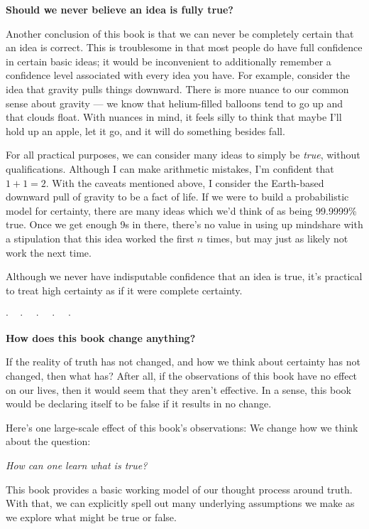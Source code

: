 \documentclass[9pt, twoside]{book}
\theoremstyle{argtstyle}
\newcommand{\dotq}{\cdot\quad}
\newcommand{\scenebreak}{
    \medskip\centerline{$\dotq\dotq\dotq\dotq\cdot$}\medskip
}
\begin{document}
\noindent
{\bf Should we never believe an idea is fully true?}

Another conclusion of this book is that we can never be completely certain
that an idea is correct.
This is troublesome in that most people do have full confidence in certain
basic
ideas; it would be inconvenient to additionally remember a confidence level
associated with every idea you have.
For example, consider the idea that gravity pulls things downward.
There is more nuance to our common sense about gravity --- we know that
helium-filled balloons tend to go up and that clouds float.
With nuances in mind, it feels silly to think that maybe I'll hold up an
apple, let it go, and it will do something besides fall.

For all practical purposes, we can consider many ideas to simply be {\em true},
without qualifications. Although I can make arithmetic mistakes, I'm confident
that $1+1=2$. With the caveats mentioned above, I consider the Earth-based
downward pull of gravity to be a fact of life. If we were to build a
probabilistic model for certainty, there are many ideas which we'd think of as
being 99.9999\% true. Once we get enough 9s in there,
there's no value in using up mindshare with a stipulation that this idea worked
the first $n$ times, but may just as likely not work the next time.

Although we never have indisputable confidence that an idea is true,
it's practical to treat high certainty as if it were complete certainty.

\scenebreak

\noindent
{\bf How does this book change anything?}

If the reality of truth has not changed, and how we think about certainty has
not changed, then what has? After all, if the observations of this
book have no effect on our lives, then it would seem that they aren't
effective. In a sense, this book would be declaring itself to be false if
it results in no change.

Here's one large-scale effect of this book's observations:
We change how we think about the question:

\medskip
\centerline{\em How can one learn what is true?}
\medskip

This book provides a basic working model of our thought process around truth.
With that, we can explicitly spell out many underlying assumptions we
make as we explore what might be true or false.
\end{document}
